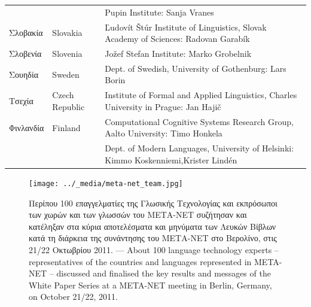 \begin{longtable}{@{}llp{113mm}@{}}
  & & Pupin Institute: Sanja Vranes \\ \addlinespace  
  Σλοβακία & \textcolor{grey1}{Slovakia} & Ľudovít Štúr Institute of Linguistics, Slovak Academy of Sciences: Radovan Garabík \\ \addlinespace 
  Σλοβενία & \textcolor{grey1}{Slovenia} & Jožef Stefan Institute: Marko Grobelnik \\ \addlinespace 
  Σουηδία & \textcolor{grey1}{Sweden} & Dept. of Swedish, University of Gothenburg: Lars Borin \\ \addlinespace 
  Τσεχία & \textcolor{grey1}{Czech Republic} & Institute of Formal and Applied Linguistics, Charles University in Prague: Jan Hajič \\ \addlinespace
  Φινλανδία & \textcolor{grey1}{Finland} & Computational Cognitive Systems Research Group, Aalto University: Timo Honkela\\ \addlinespace
  & & Dept. of Modern Languages, University of Helsinki: Kimmo Koskenniemi,\newline Krister Lindén 
\end{longtable}
\normalsize

\renewcommand*{\figureformat}{}
\renewcommand*{\captionformat}{}

\begin{figure}[htbp]
  \center
    \texttt{[image: ../\_media/meta-net\_team.jpg]}
  \caption{Περίπου 100 επαγγελματίες της Γλωσικής Τεχνολογίας και εκπρόσωποι των χωρών και των γλωσσών του ΜΕΤΑ-ΝΕΤ συζήτησαν και κατέληξαν στα κύρια αποτελέσματα και μηνύματα των Λευκών Βίβλων κατά τη διάρκεια της συνάντησης του ΜΕΤΑ-ΝΕΤ στο Βερολίνο, στις 21/22 Οκτωβρίου 2011. --- \textcolor{grey1}{About 100 language technology experts -- representatives of the countries and languages represented in META-NET -- discussed and finalised the key results and messages of the White Paper Series at a META-NET meeting in Berlin, Germany, on October 21/22, 2011.}}
  \medskip
\end{figure}

\cleardoublepage

\label{whitepaperseries}

